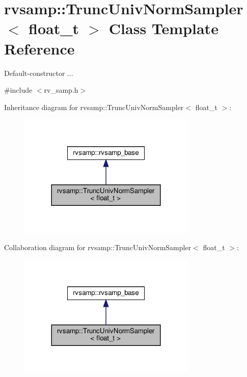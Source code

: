 \hypertarget{classrvsamp_1_1TruncUnivNormSampler}{}\section{rvsamp\+:\+:Trunc\+Univ\+Norm\+Sampler$<$ float\+\_\+t $>$ Class Template Reference}
\label{classrvsamp_1_1TruncUnivNormSampler}


Default-\/constructor ...  




{\ttfamily \#include $<$rv\+\_\+samp.\+h$>$}



Inheritance diagram for rvsamp\+:\+:Trunc\+Univ\+Norm\+Sampler$<$ float\+\_\+t $>$\+:\nopagebreak
\begin{figure}[H]
\begin{center}
\leavevmode
\includegraphics[width=240pt]{classrvsamp_1_1TruncUnivNormSampler__inherit__graph}
\end{center}
\end{figure}


Collaboration diagram for rvsamp\+:\+:Trunc\+Univ\+Norm\+Sampler$<$ float\+\_\+t $>$\+:\nopagebreak
\begin{figure}[H]
\begin{center}
\leavevmode
\includegraphics[width=240pt]{classrvsamp_1_1TruncUnivNormSampler__coll__graph}
\end{center}
\end{figure}
